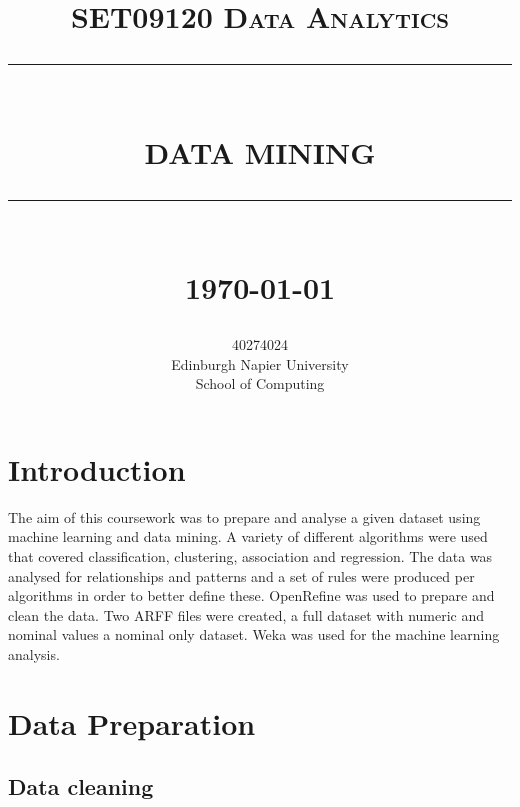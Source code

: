 \documentclass[12pt]{article}
\newcommand{\HRule}[1]{\rule{\linewidth}{#1}}
\begin{document}
\title{ \normalsize \textsc{SET09120 Data Analytics}
        \\ [2.0cm]
        \HRule{0.5pt} \\
        \LARGE \textbf{\uppercase{Data Mining}}
        \HRule{2pt} \\ [0.5cm]
        \normalsize \monthyeardate\today \vspace*{5\baselineskip}}

\author{
        40274024 \\ 
        Edinburgh Napier University \\
        School of Computing 
        \date{}}

\maketitle

\newpage

\sectionfont{\scshape}


\section{Introduction}
The aim of this coursework was to prepare and analyse a given dataset using machine learning and data mining. A variety of different algorithms were used that covered classification, clustering, association and regression. The data was analysed for relationships and patterns and a set of rules were produced per algorithms in order to better define these. OpenRefine was used to prepare and clean the data. Two ARFF files were created, a full dataset with numeric and nominal values a nominal only dataset. Weka was used for the machine learning analysis.


\section{Data Preparation}
\subsection{Data cleaning}
\end{document}
